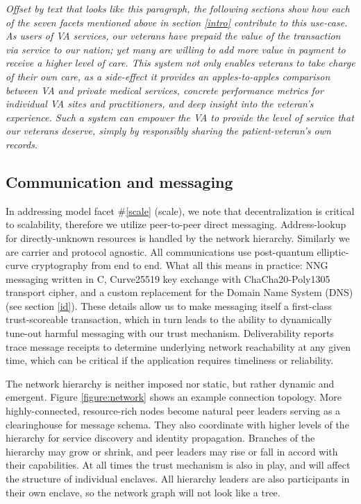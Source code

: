 \documentclass[10pt, twoside]{article}
\newenvironment{ppl}{\fontfamily{ppl}\selectfont\itshape}{\par}
\begin{document}
\begin{ppl}
Offset by text that looks like this paragraph, the following sections show how each of the seven facets mentioned above in section \ref{intro} contribute to this use-case. As users of VA services, our veterans have prepaid the value of the transaction via service to our nation; yet many are willing to add more value in payment to receive a higher level of care. This system not only enables veterans to take charge of their own care, as a side-effect it provides an apples-to-apples comparison between VA and private medical services, concrete performance metrics for individual VA sites and practitioners, and deep insight into the veteran's experience. Such a system can empower the VA to provide the level of service that our veterans deserve, simply by responsibly sharing the patient-veteran's own records.
\end{ppl}

\subsection{Communication and messaging} \label{comms}

In addressing model facet \#\ref{scale} (scale), we note that decentralization is critical to scalability, therefore we utilize peer-to-peer direct messaging. Address-lookup for directly-unknown resources is handled by the network hierarchy. Similarly we are carrier and protocol agnostic. All communications use post-quantum elliptic-curve cryptography from end to end.
What all this means in practice: NNG messaging written in C, Curve25519 key exchange with ChaCha20-Poly1305 transport cipher, and a custom replacement for the Domain Name System (DNS) (see section \ref{id}). These details allow us to make messaging itself a first-class trust-scoreable transaction, which in turn leads to the ability to dynamically tune-out harmful messaging with our trust mechanism. Deliverability reports trace message receipts to determine underlying network reachability at any given time, which can be critical if the application requires timeliness or reliability.

The network hierarchy is neither imposed nor static, but rather dynamic and emergent. Figure \ref{figure:network} shows an example connection topology. More highly-connected, resource-rich nodes become natural peer leaders serving as a clearinghouse for message schema. They also coordinate with higher levels of the hierarchy for service discovery and identity propagation. Branches of the hierarchy may grow or shrink, and peer leaders may rise or fall in accord with their capabilities. At all times the trust mechanism is also in play, and will affect the structure of individual enclaves. All hierarchy leaders are also participants in their own enclave, so the network graph will not look like a tree.
\end{document}

